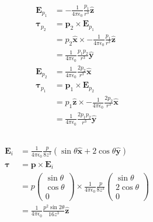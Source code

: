 \documentclass{article}
\renewcommand{\vec}[1]{\boldsymbol{\mathbf{#1}}}
\newcommand{\uvec}[1]{\hat{\vec{#1}}}
\newcommand{\ke}{\frac{1}{4 \pi \epsilon_0}}
\begin{document}
\subsection{}

\begin{align*}
  \vec{E}_{p_1}    & = -\ke \frac{p_1}{r^3} \uvec{z}                       \\
  \vec{\tau}_{p_2} & = \vec{p}_2 \times \vec{E}_{p_1}                      \\
                   & = p_2 \uvec{x} \times -\ke \frac{p_1}{r^3} \uvec{z}   \\
                   & = \ke \frac{p_1 p_2}{r^3} \uvec{y}                    \\
  \vec{E}_{p_2}    & = \ke \frac{2 p_2}{r^3} \uvec{x}                      \\
  \vec{\tau}_{p_1} & = \vec{p}_1 \times \vec{E}_{p_2}                      \\
                   & = p_1 \uvec{z} \times -\ke \frac{2 p_2}{r^3} \uvec{x} \\
                   & = \ke \frac{2 p_1 p_2}{r^3} \uvec{y}
\end{align*}

\subsection{}

\begin{align*}
  \vec{E}_i  & = \ke \frac{p}{8 z^3} (\sin \theta \uvec{x} + 2 \cos \theta \uvec{y}) \\
  \vec{\tau} & = \vec{p} \times \vec{E}_i                                            \\
             & = p \begin{pmatrix}
                     \sin \theta \\
                     \cos \theta \\
                     0
                   \end{pmatrix} \times \ke \frac{p}{8 z^3} \begin{pmatrix}
                                                              \sin \theta   \\
                                                              2 \cos \theta \\
                                                              0
                                                            \end{pmatrix}           \\
             & = \ke \frac{p^2 \sin 2 \theta}{16 z^3} \uvec{z}
\end{align*}
\end{document}
